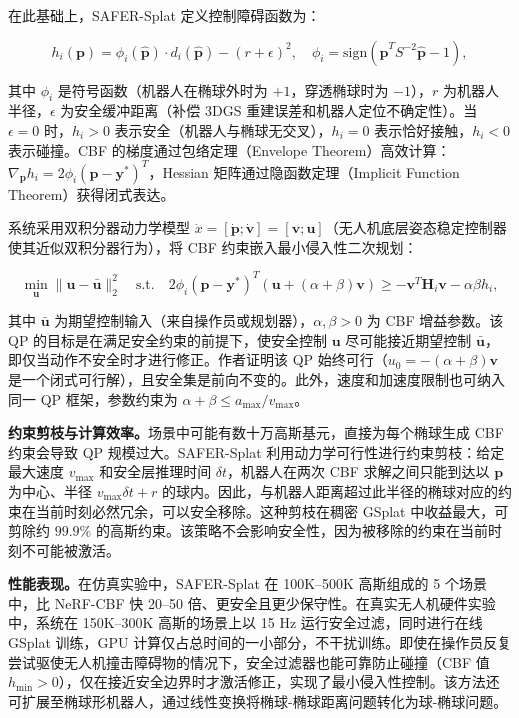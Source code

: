 在此基础上，SAFER-Splat 定义控制障碍函数为：

\begin{equation}
    h_i(\mathbf{p}) = \phi_i(\hat{\mathbf{p}}) \cdot d_i(\hat{\mathbf{p}}) - (r + \epsilon)^2, \quad \phi_i = \text{sign}(\hat{\mathbf{p}}^T S^{-2} \hat{\mathbf{p}} - 1),
\end{equation}

其中 $\phi_i$ 是符号函数（机器人在椭球外时为 $+1$，穿透椭球时为 $-1$），$r$ 为机器人半径，$\epsilon$ 为安全缓冲距离（补偿 3DGS 重建误差和机器人定位不确定性）。当 $\epsilon = 0$ 时，$h_i > 0$ 表示安全（机器人与椭球无交叉），$h_i = 0$ 表示恰好接触，$h_i < 0$ 表示碰撞。CBF 的梯度通过包络定理（Envelope Theorem）高效计算：$\nabla_{\mathbf{p}} h_i = 2\phi_i(\mathbf{p} - \mathbf{y}^*)^T$，Hessian 矩阵通过隐函数定理（Implicit Function Theorem）获得闭式表达。

系统采用双积分器动力学模型 $\dot{x} = [\dot{\mathbf{p}}; \dot{\mathbf{v}}] = [\mathbf{v}; \mathbf{u}]$（无人机底层姿态稳定控制器使其近似双积分器行为），将 CBF 约束嵌入最小侵入性二次规划：

\begin{equation}
    \min_{\mathbf{u}} \|\mathbf{u} - \bar{\mathbf{u}}\|_2^2 \quad \text{s.t.} \quad 2\phi_i(\mathbf{p} - \mathbf{y}^*)^T(\mathbf{u} + (\alpha + \beta)\mathbf{v}) \geq -\mathbf{v}^T \mathbf{H}_i \mathbf{v} - \alpha\beta h_i,
\end{equation}

其中 $\bar{\mathbf{u}}$ 为期望控制输入（来自操作员或规划器），$\alpha, \beta > 0$ 为 CBF 增益参数。该 QP 的目标是在满足安全约束的前提下，使安全控制 $\mathbf{u}$ 尽可能接近期望控制 $\bar{\mathbf{u}}$，即仅当动作不安全时才进行修正。作者证明该 QP 始终可行（$u_0 = -(\alpha + \beta)\mathbf{v}$ 是一个闭式可行解），且安全集是前向不变的。此外，速度和加速度限制也可纳入同一 QP 框架，参数约束为 $\alpha + \beta \leq a_{\max}/v_{\max}$。

\textbf{约束剪枝与计算效率。}场景中可能有数十万高斯基元，直接为每个椭球生成 CBF 约束会导致 QP 规模过大。SAFER-Splat 利用动力学可行性进行约束剪枝：给定最大速度 $v_{\max}$ 和安全层推理时间 $\delta t$，机器人在两次 CBF 求解之间只能到达以 $\mathbf{p}$ 为中心、半径 $v_{\max}\delta t + r$ 的球内。因此，与机器人距离超过此半径的椭球对应的约束在当前时刻必然冗余，可以安全移除。这种剪枝在稠密 GSplat 中收益最大，可剪除约 $99.9\%$ 的高斯约束。该策略不会影响安全性，因为被移除的约束在当前时刻不可能被激活。

\textbf{性能表现。}在仿真实验中，SAFER-Splat 在 100K--500K 高斯组成的 5 个场景中，比 NeRF-CBF 快 20--50 倍、更安全且更少保守性。在真实无人机硬件实验中，系统在 150K--300K 高斯的场景上以 15 Hz 运行安全过滤，同时进行在线 GSplat 训练，GPU 计算仅占总时间的一小部分，不干扰训练。即使在操作员反复尝试驱使无人机撞击障碍物的情况下，安全过滤器也能可靠防止碰撞（CBF 值 $h_{\min} > 0$），仅在接近安全边界时才激活修正，实现了最小侵入性控制。该方法还可扩展至椭球形机器人，通过线性变换将椭球-椭球距离问题转化为球-椭球问题。

